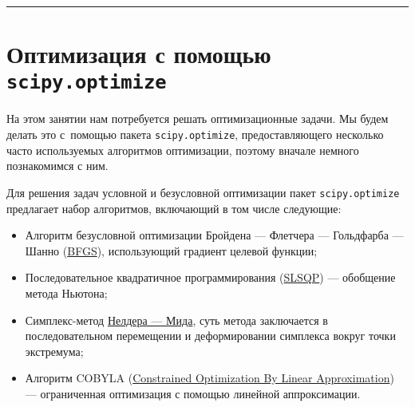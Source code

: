 \documentclass[11pt,a4paper]{article}
\providecommand{\tightlist}{%
  \setlength{\itemsep}{0pt}\setlength{\parskip}{0pt}}
\begin{document}
    \begin{center}\rule{0.5\linewidth}{0.5pt}\end{center}

    \hypertarget{ux43eux43fux442ux438ux43cux438ux437ux430ux446ux438ux44f-ux441-ux43fux43eux43cux43eux449ux44cux44e-scipy.optimize}{%
\section{\texorpdfstring{Оптимизация с помощью
\texttt{scipy.optimize}}{Оптимизация с помощью scipy.optimize}}\label{ux43eux43fux442ux438ux43cux438ux437ux430ux446ux438ux44f-ux441-ux43fux43eux43cux43eux449ux44cux44e-scipy.optimize}}

На этом занятии нам потребуется решать оптимизационные задачи.
Мы будем делать это с~помощью пакета \texttt{scipy.optimize}, предоставляющего несколько часто используемых алгоритмов оптимизации, поэтому вначале немного познакомимся с ним.

Для решения задач условной и безусловной оптимизации пакет \texttt{scipy.optimize} предлагает набор алгоритмов, включающий в том числе следующие:

\begin{itemize}
\tightlist
\item
  Алгоритм безусловной оптимизации Бройдена --- Флетчера --- Гольдфарба
  --- Шанно
  (\href{https://ru.wikipedia.org/wiki/\%D0\%90\%D0\%BB\%D0\%B3\%D0\%BE\%D1\%80\%D0\%B8\%D1\%82\%D0\%BC_\%D0\%91\%D1\%80\%D0\%BE\%D0\%B9\%D0\%B4\%D0\%B5\%D0\%BD\%D0\%B0_\%E2\%80\%94_\%D0\%A4\%D0\%BB\%D0\%B5\%D1\%82\%D1\%87\%D0\%B5\%D1\%80\%D0\%B0_\%E2\%80\%94_\%D0\%93\%D0\%BE\%D0\%BB\%D1\%8C\%D0\%B4\%D1\%84\%D0\%B0\%D1\%80\%D0\%B1\%D0\%B0_\%E2\%80\%94_\%D0\%A8\%D0\%B0\%D0\%BD\%D0\%BD\%D0\%BE}{BFGS}), использующий градиент целевой функции;
\item
  Последовательное квадратичное программирования
  (\href{https://ru.wikipedia.org/wiki/\%D0\%9F\%D0\%BE\%D1\%81\%D0\%BB\%D0\%B5\%D0\%B4\%D0\%BE\%D0\%B2\%D0\%B0\%D1\%82\%D0\%B5\%D0\%BB\%D1\%8C\%D0\%BD\%D0\%BE\%D0\%B5_\%D0\%BA\%D0\%B2\%D0\%B0\%D0\%B4\%D1\%80\%D0\%B0\%D1\%82\%D0\%B8\%D1\%87\%D0\%BD\%D0\%BE\%D0\%B5_\%D0\%BF\%D1\%80\%D0\%BE\%D0\%B3\%D1\%80\%D0\%B0\%D0\%BC\%D0\%BC\%D0\%B8\%D1\%80\%D0\%BE\%D0\%B2\%D0\%B0\%D0\%BD\%D0\%B8\%D0\%B5}{SLSQP})
  --- обобщение метода Ньютона;
\item
  Симплекс-метод
  \href{https://ru.wikipedia.org/wiki/\%D0\%9C\%D0\%B5\%D1\%82\%D0\%BE\%D0\%B4_\%D0\%9D\%D0\%B5\%D0\%BB\%D0\%B4\%D0\%B5\%D1\%80\%D0\%B0_\%E2\%80\%94_\%D0\%9C\%D0\%B8\%D0\%B4\%D0\%B0}{Нелдера
  --- Мида}, суть метода заключается в последовательном перемещении и деформировании симплекса вокруг точки экстремума;
\item
  Алгоритм COBYLA
  (\href{https://nlopt.readthedocs.io/en/latest/NLopt_Algorithms/}{Constrained
  Optimization By Linear Approximation}) --- ограниченная оптимизация с помощью линейной аппроксимации.
\end{itemize}
\end{document}
